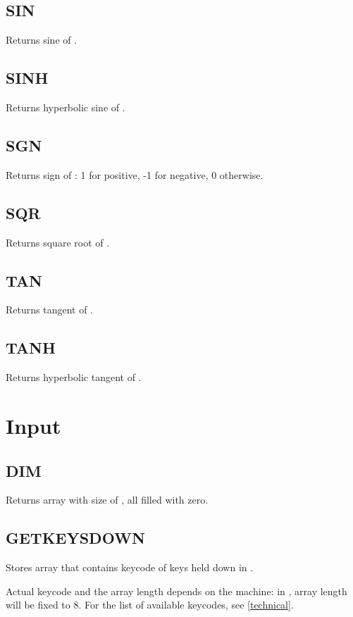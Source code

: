     \subsection{SIN}
        \par
        Returns sine of .
    \subsection{SINH}
        \par
        Returns hyperbolic sine of .
    \subsection{SGN}
        \par
        Returns sign of : 1 for positive, -1 for negative, 0 otherwise.
    \subsection{SQR}
        \par
        Returns square root of .
    \subsection{TAN}
        \par
        Returns tangent of .
    \subsection{TANH}
        \par
        Returns hyperbolic tangent of .

\section{Input}

    \subsection{DIM}
        \par
        Returns array with size of , all filled with zero.
    \subsection{GETKEYSDOWN}
        \par
        Stores array that contains keycode of keys held down in .\par
        Actual keycode and the array length depends on the machine: in \thismachine , array length will be fixed to 8. For the list of available keycodes, see \ref{technical}.
